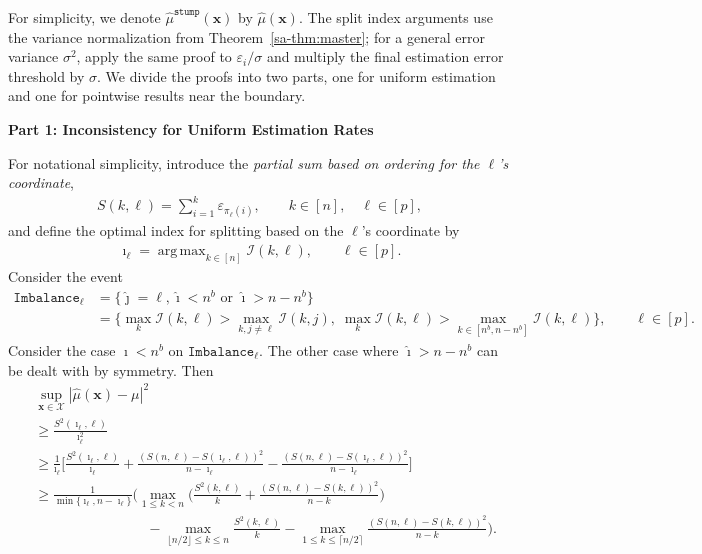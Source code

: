 \documentclass[10pt]{article}
\DeclareMathOperator*{\argmax}{arg\,max}
\def\bx{\mathbf{x}}
\def\X{\mathcal{X}}
\def\I{\mathscr{I}}
\def\mustump{\hat{\mu}^{\mathtt{stump}}}
\theoremstyle{definition}
\theoremstyle{remark}
\begin{document}
For simplicity, we denote $\mustump(\bx)$ by $\hat{\mu}(\bx)$. The split index arguments use the variance normalization from Theorem~\ref{sa-thm:master}; for a general error variance $\sigma^2$, apply the same proof to $\varepsilon_i/\sigma$ and multiply the final estimation error threshold by $\sigma$. We divide the proofs into two parts, one for uniform estimation and one for pointwise results near the boundary.
\begin{center}
\textbf{Part 1: Inconsistency for Uniform Estimation Rates}
\end{center}
For notational simplicity, introduce the \emph{partial sum based on ordering for the $\ell$'s coordinate},
\begin{align*}
    S(k,\ell) = \sum_{i = 1}^{k} \varepsilon_{\pi_{\ell}(i)}, \qquad k \in [n], \quad \ell \in [p],
\end{align*}
and define the optimal index for splitting based on the $\ell$'s coordinate by
\begin{align*}
    \imath_{\ell} = \argmax_{k \in [n]} \I(k,\ell), \qquad \ell \in [p].
\end{align*}
Consider the event
\begin{align*}
    \mathtt{Imbalance}_{\ell} & = \{\hat{\jmath} = \ell, \hat{\imath} < n^b \text{ or } \hat{\imath} > n - n^b\} \\
    & = \{\max_k\I(k,\ell) > \max_{k,j\neq \ell}\I(k,j), \; \max_{k}\I(k,\ell) > \max_{k \in [n^b, n - n^b]}\I(k,\ell)\}, \qquad \ell \in [p].
\end{align*}
Consider the case $\hat{\imath} < n^b$ on $\mathtt{Imbalance}_{\ell}$. The other case where $\hat{\imath} > n - n^b$ can be dealt with by symmetry. Then
\begin{align*}
    & \sup_{\bx \in \X} |\hat{\mu}(\bx) - \mu|^2 \\
    & \geq \frac{S^2(\imath_{\ell}, \ell)}{\imath_{\ell}^2} \\
    & \geq \frac{1}{\imath_{\ell}} \bigg[\frac{S^2(\imath_{\ell}, \ell)}{\imath_{\ell}} + \frac{(S(n,\ell) - S(\imath_{\ell}, \ell))^2}{n - \imath_{\ell}} - \frac{(S(n,\ell) - S(\imath_{\ell}, \ell))^2}{n - \imath_{\ell}}\bigg] \\
    & \geq \frac{1}{\min\{\imath_{\ell}, n - \imath_{\ell}\}} \bigg(\max_{1 \leq k < n} \Big(\frac{S^2(k, \ell)}{k} + \frac{(S(n,\ell) - S(k, \ell))^2}{n - k} \Big) \\
    & \qquad\qquad\qquad\qquad - \max_{\lfloor n/2 \rfloor \leq k \leq n}\frac{S^2(k, \ell)}{k} - \max_{1 \leq k \leq \lceil n/2 \rceil}\frac{(S(n,\ell) - S(k, \ell))^2}{n - k} \bigg).
\end{align*}
\end{document}
